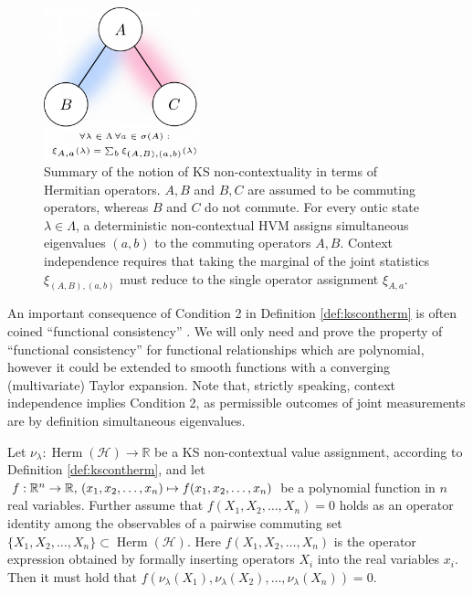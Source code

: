 \begin{figure}
    \centering
    \includegraphics[width=0.4\textwidth]{images/trianglegraph.png}
    \caption{Summary of the notion of KS non-contextuality in terms of Hermitian operators. $A,B$ and $B,C$ are assumed to be commuting operators, whereas $B$ and $C$ do not commute. For every ontic state $\lambda\in\Lambda$, a deterministic non-contextual HVM assigns simultaneous eigenvalues $(a,b)$ to the commuting operators ${A,B}$. Context independence requires that taking the marginal of the joint statistics $\xi_{(A,B),(a,b)}$ must reduce to the single operator assignment $\xi_{A,a}$.}
    \label{fig:trianglegraph}
\end{figure}

An important consequence of Condition 2 in Definition \ref{def:kscontherm} is often coined “functional consistency” \cite{Peres2002}. We will only need and prove the property of “functional consistency” for functional relationships which are polynomial, however it could be extended to smooth functions with a converging (multivariate) Taylor expansion. Note that, strictly speaking, context independence implies Condition 2, as permissible outcomes of joint measurements are by definition simultaneous eigenvalues.

\begin{lemma}\label{lem:funcconsist}\hfill\break Let $\nu_{\lambda}:\operatorname{Herm}(\mathcal{H})\rightarrow\mathbb{\mathbb{R}}$ be a KS non-contextual value assignment, according to Definition \ref{def:kscontherm}, and let $f:\mathbb{R}^{n}\rightarrow\mathbb{R},\thinspace(x_{1},x_{2},\dots,x_{n})\mapsto f(x_{1},x_{2},\dots,x_{n})$ be a polynomial function in $n$ real variables. Further assume that $f(X_{1},X_{2},\dots,X_{n})=0$ holds as an operator identity among the observables of a pairwise commuting set $\{X_{1},X_{2},\dots,X_{n}\}\subset\operatorname{Herm}(\mathcal{H})$. Here $f(X_{1},X_{2},\dots,X_{n})$ is the operator expression obtained by formally inserting operators $X_{i}$ into the real variables $x_{i}$. Then it must hold that $f(\nu_{\lambda}(X_{1}),\nu_{\lambda}(X_{2}),\dots,\nu_{\lambda}(X_{n}))=0$. 
\end{lemma}

